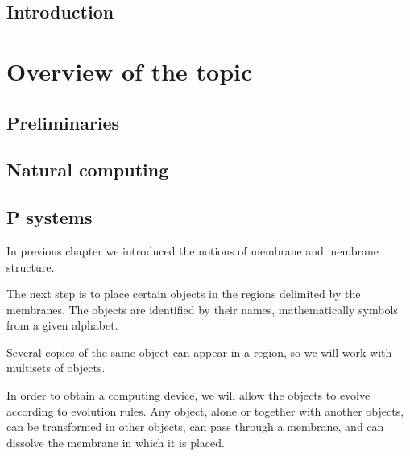 \documentclass[12pt,oneside,openany,pagenumber=footcenter]{book}
\begin{document}
\chapter*{Introduction} %
\label{cha:introduction}



\part{Overview of the topic} %
\label{part:overview_of_the_topic}


\chapter{Preliminaries} %
\label{cha:preliminaries}



\chapter{Natural computing} %
\label{cha:natural_computing}



\chapter{P systems} %
\label{cha:p_systems}

In previous chapter we introduced the notions of membrane and membrane structure.


The next step is to place certain objects in the regions delimited by the membranes. The objects are identified by their names, mathematically symbols from a given alphabet.


Several copies of the same object can appear in a region, so we will work with multisets of objects.


In order to obtain a computing device, we will allow the objects to evolve according to evolution rules. Any object, alone or together with another objects, can be transformed in other objects, can pass through a membrane, and can dissolve the membrane in which it is placed.

\end{document}
